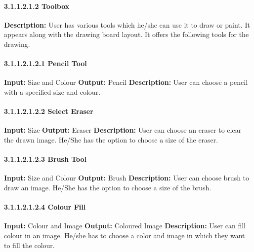 \documentclass{scrreprt}
\begin{document}
\paragraph{3.1.1.2.1.2 Toolbox}
\hfill \vspace{2.5mm} \break 
\textbf{Description:} \newline
User has various tools which
he/she can use it to draw or paint. It appears along with the drawing board layout. It offers the following tools for the drawing.

\paragraph{3.1.1.2.1.2.1 Pencil Tool}
\hfill \vspace{2.5mm} \break 
\textbf{Input:} Size and Colour \newline
\textbf{Output:} Pencil
\vspace{1mm}\newline
\textbf{Description:} \newline 
User can choose a pencil with a specified size and colour.

\paragraph{3.1.1.2.1.2.2 Select Eraser}
\hfill \vspace{2.5mm} \break 
\textbf{Input:} Size \newline
\textbf{Output:} Eraser
\vspace{1mm}\newline
\textbf{Description:} \newline 
User can choose an eraser to 
clear the drawn image. He/She has the 
option to choose a size of the eraser.


\paragraph{3.1.1.2.1.2.3 Brush Tool}
\hfill \vspace{2.5mm} \break 
\textbf{Input:} Size and Colour \newline
\textbf{Output:} Brush
\vspace{1mm}\newline
\textbf{Description:} \newline 
User can choose brush to draw an image. He/She has the option to choose a size of the brush.

\paragraph{3.1.1.2.1.2.4 Colour Fill}
\hfill \vspace{2.5mm} \break 
\textbf{Input:} Colour and Image \newline
\textbf{Output:} Coloured Image
\vspace{1mm}\newline
\textbf{Description:} \newline 
User can fill colour in an image. He/she has to choose a color and image in which they want to fill the colour.
\end{document}
